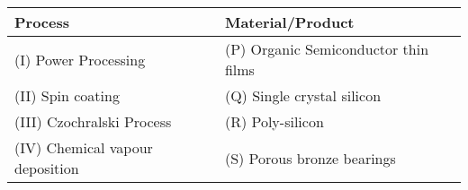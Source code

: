 \begin{tabular}{|m{15em} | m{15em} |}
    \hline
        \textbf{{Process}} & \textbf{{Material/Product}}\\
    \hline 
        (I) Power Processing & (P) Organic Semiconductor thin films\\
    \hline 
        (II) Spin coating & (Q) Single crystal silicon\\
    \hline
        (III) Czochralski Process & (R) Poly-silicon\\
    \hline 
        (IV) Chemical vapour deposition & (S) Porous bronze bearings\\
    \hline
\end{tabular}